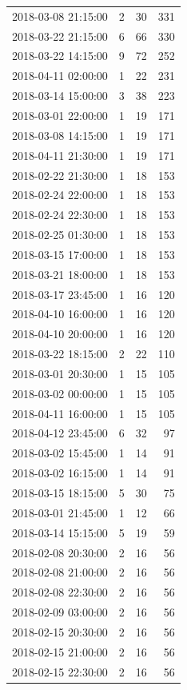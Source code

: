 \begin{tabular}{lrrr}
2018-03-08 21:15:00 & 2 & 30 & 331 \\
2018-03-22 21:15:00 & 6 & 66 & 330 \\
2018-03-22 14:15:00 & 9 & 72 & 252 \\
2018-04-11 02:00:00 & 1 & 22 & 231 \\
2018-03-14 15:00:00 & 3 & 38 & 223 \\
2018-03-01 22:00:00 & 1 & 19 & 171 \\
2018-03-08 14:15:00 & 1 & 19 & 171 \\
2018-04-11 21:30:00 & 1 & 19 & 171 \\
2018-02-22 21:30:00 & 1 & 18 & 153 \\
2018-02-24 22:00:00 & 1 & 18 & 153 \\
2018-02-24 22:30:00 & 1 & 18 & 153 \\
2018-02-25 01:30:00 & 1 & 18 & 153 \\
2018-03-15 17:00:00 & 1 & 18 & 153 \\
2018-03-21 18:00:00 & 1 & 18 & 153 \\
2018-03-17 23:45:00 & 1 & 16 & 120 \\
2018-04-10 16:00:00 & 1 & 16 & 120 \\
2018-04-10 20:00:00 & 1 & 16 & 120 \\
2018-03-22 18:15:00 & 2 & 22 & 110 \\
2018-03-01 20:30:00 & 1 & 15 & 105 \\
2018-03-02 00:00:00 & 1 & 15 & 105 \\
2018-04-11 16:00:00 & 1 & 15 & 105 \\
2018-04-12 23:45:00 & 6 & 32 & 97 \\
2018-03-02 15:45:00 & 1 & 14 & 91 \\
2018-03-02 16:15:00 & 1 & 14 & 91 \\
2018-03-15 18:15:00 & 5 & 30 & 75 \\
2018-03-01 21:45:00 & 1 & 12 & 66 \\
2018-03-14 15:15:00 & 5 & 19 & 59 \\
2018-02-08 20:30:00 & 2 & 16 & 56 \\
2018-02-08 21:00:00 & 2 & 16 & 56 \\
2018-02-08 22:30:00 & 2 & 16 & 56 \\
2018-02-09 03:00:00 & 2 & 16 & 56 \\
2018-02-15 20:30:00 & 2 & 16 & 56 \\
2018-02-15 21:00:00 & 2 & 16 & 56 \\
2018-02-15 22:30:00 & 2 & 16 & 56 \\

\end{tabular}
